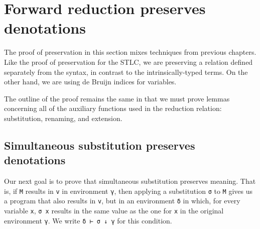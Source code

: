 \hypertarget{forward-reduction-preserves-denotations}{%
\section{Forward reduction preserves
denotations}\label{forward-reduction-preserves-denotations}}

The proof of preservation in this section mixes techniques from previous
chapters. Like the proof of preservation for the STLC, we are preserving
a relation defined separately from the syntax, in contrast to the
intrinsically-typed terms. On the other hand, we are using de Bruijn
indices for variables.

The outline of the proof remains the same in that we must prove lemmas
concerning all of the auxiliary functions used in the reduction
relation: substitution, renaming, and extension.

\hypertarget{simultaneous-substitution-preserves-denotations}{%
\subsection{Simultaneous substitution preserves
denotations}\label{simultaneous-substitution-preserves-denotations}}

Our next goal is to prove that simultaneous substitution preserves
meaning. That is, if \texttt{M} results in \texttt{v} in environment
\texttt{γ}, then applying a substitution \texttt{σ} to \texttt{M} gives
us a program that also results in \texttt{v}, but in an environment
\texttt{δ} in which, for every variable \texttt{x}, \texttt{σ\ x}
results in the same value as the one for \texttt{x} in the original
environment \texttt{γ}. We write \texttt{δ\ ⊢\ σ\ ↓\ γ} for this
condition.


